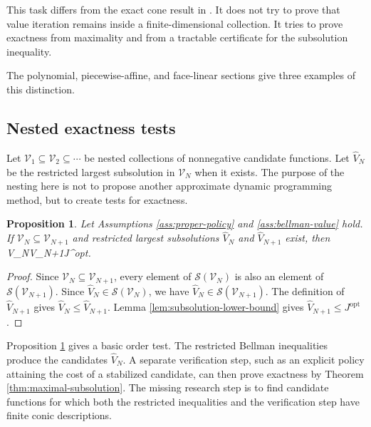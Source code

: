 \documentclass{article}
\newtheorem{proposition}{Proposition}
\begin{document}
This task differs from the exact cone result in \cite{pates-rantzer-cdc}. It does not try to prove that value iteration remains inside a finite-dimensional collection. It tries to prove exactness from maximality and from a tractable certificate for the subsolution inequality.

The polynomial, piecewise-affine, and face-linear sections give three examples of this distinction.

\subsection{Nested exactness tests}

Let $\mathcal V_1\subseteq\mathcal V_2\subseteq\cdots$ be nested collections of nonnegative candidate functions. Let $\widehat V_N$ be the restricted largest subsolution in $\mathcal V_N$ when it exists. The purpose of the nesting here is not to propose another approximate dynamic programming method, but to create tests for exactness.

\begin{proposition}
\label{prop:monotone-nested}
Let Assumptions \ref{ass:proper-policy} and \ref{ass:bellman-value} hold. If $\mathcal V_N\subseteq\mathcal V_{N+1}$ and restricted largest subsolutions $\widehat V_N$ and $\widehat V_{N+1}$ exist, then
\BEQ
\widehat V_N\leq \widehat V_{N+1}\leq J^\textrm{opt}.
\label{eq:nested-monotonicity}
\EEQ
\end{proposition}

\begin{proof}
Since $\mathcal V_N\subseteq\mathcal V_{N+1}$, every element of $\mathcal S(\mathcal V_N)$ is also an element of $\mathcal S(\mathcal V_{N+1})$. Since $\widehat V_N\in\mathcal S(\mathcal V_N)$, we have $\widehat V_N\in\mathcal S(\mathcal V_{N+1})$. The definition of $\widehat V_{N+1}$ gives $\widehat V_N\leq\widehat V_{N+1}$. Lemma \ref{lem:subsolution-lower-bound} gives $\widehat V_{N+1}\leq J^\textrm{opt}$.
\end{proof}

Proposition \ref{prop:monotone-nested} gives a basic order test. The restricted Bellman inequalities produce the candidates $\widehat V_N$. A separate verification step, such as an explicit policy attaining the cost of a stabilized candidate, can then prove exactness by Theorem \ref{thm:maximal-subsolution}. The missing research step is to find candidate functions for which both the restricted inequalities and the verification step have finite conic descriptions.
\end{document}
